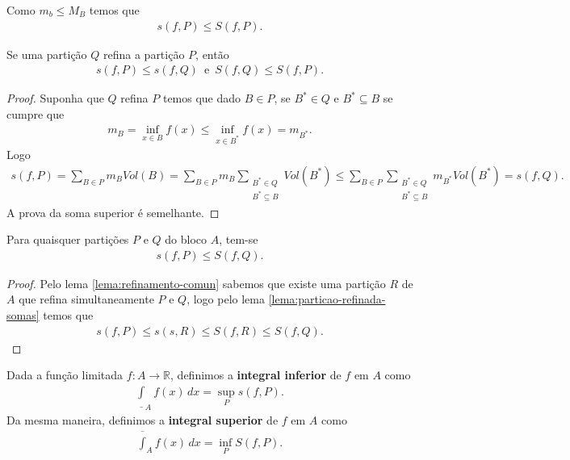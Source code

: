 \begin{note}
  Como $m_b\leq M_B$ temos que
  \begin{align*}
    s(f,P)\leq S(f,P).
  \end{align*}
\end{note}
\begin{lemma}\label{lema:particao-refinada-somas}
  Se uma partição $Q$ refina a partição $P$, então
  \begin{align*}
    s(f,P)\leq s(f,Q)\,\text{ e }\,S(f,Q)\leq S(f,P).
  \end{align*}
\end{lemma}
\begin{proof} 
  Suponha que $Q$ refina $P$ temos que dado $B\in P$, se $B^{\ast}\in Q$ e $B^{\ast}\subseteq B$ se cumpre que 
  \begin{align*}
    m_{B}=\inf_{x\in B}f(x)\leq \inf_{x\in B^{\ast}}f(x)=m_{B^{\ast}}.
  \end{align*}
  Logo
  \begin{align*}
    s(f,P)=\sum_{B\in P}m_BVol(B)=\sum_{B\in P}m_B\sum_{\substack{B^{\ast}\in Q\\ B^{\ast}\subseteq B}}Vol(B^{\ast})\leq\sum_{B\in P}\sum_{\substack{B^{\ast}\in Q\\ B^{\ast}\subseteq B}}m_{B^{\ast}}Vol(B^{\ast})=s(f,Q).
  \end{align*}
  A prova da soma superior é semelhante.
\end{proof}
\begin{lemma}\label{lema:somainferior-somasuperior}
  Para quaisquer partições $P$ e $Q$ do bloco $A$, tem-se
  \begin{align*}
    s(f,P)\leq S(f,Q).
  \end{align*}
\end{lemma}
\begin{proof}
  Pelo lema \ref{lema:refinamento-comun} sabemos que existe uma partição $R$ de $A$ que refina simultaneamente $P$ e $Q$, logo pelo lema \ref{lema:particao-refinada-somas} temos que
  \begin{align*}
    s(f,P)\leq s(s,R)\leq S(f,R)\leq S(f,Q).
  \end{align*}
\end{proof}
\begin{definition}
  Dada a função limitada $f:A\to\mathbb{R}$, definimos a \textbf{integral inferior} de $f$ em $A$ como 
  \begin{align*}
    \underline{\int}_{A}f(x)\,dx=\sup_{P}s(f,P).   
  \end{align*}
  Da mesma maneira, definimos a \textbf{integral superior} de $f$ em $A$ como 
  \begin{align*}
    \overline{\int}_{A}f(x)\,dx=\inf_{P}S(f,P).   
  \end{align*}
\end{definition}
